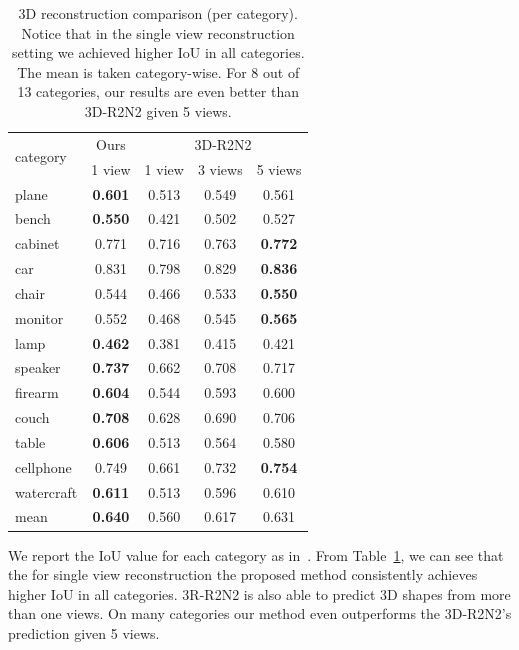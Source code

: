 \begin{table}[t!]
\centering
{
  \begin{tabular}{l|c|c|c|c}
  \hline
  \multirow{2}{*}{category} & Ours & \multicolumn{3}{|c}{3D-R2N2} \\  
  \cline{2-5}
   & 1 view & 1 view & 3 views & 5 views
  \\
  \hline
  \hline
  plane & {\textbf{0.601}} & 0.513 & 0.549 & 0.561 \\
%
  bench & {\textbf{0.550}} & 0.421 & 0.502 & 0.527 \\
  cabinet & {0.771} & 0.716 & 0.763 & \textbf{0.772}  \\
  car & {0.831} & 0.798 & 0.829 & \textbf{0.836} \\
  chair & {0.544} & 0.466 & 0.533 & \textbf{0.550}  \\
  monitor & {0.552} & 0.468 & 0.545 & \textbf{0.565} \\
  lamp & {\textbf{0.462}} & 0.381 & 0.415 & 0.421 \\
  speaker & {\textbf{0.737}} & 0.662 & 0.708 & 0.717 \\
  firearm & {\textbf{0.604}} & 0.544 & 0.593 & 0.600 \\
  couch & {\textbf{0.708}} & 0.628 & 0.690 & 0.706 \\
  table & {\textbf{0.606}} & 0.513 & 0.564 & 0.580 \\
  cellphone & {0.749} & 0.661 & 0.732 & \textbf{0.754} \\
  watercraft & {\textbf{0.611}} & 0.513 & 0.596 & 0.610 \\
  \hline
  mean & {\textbf{0.640}} & 0.560 & 0.617 & 0.631 \\
  \hline
  \end{tabular}
  }
  \caption{3D reconstruction comparison (per category). Notice that in the single view reconstruction setting we achieved higher IoU in all categories. The mean is taken category-wise. For 8 out of 13 categories, our results are even better than 3D-R2N2 given 5 views.}\label{tab:compare_category}
\end{table}

We report the IoU value for each category as in~\cite{choy20163d}. From Table~\ref{tab:compare_category},
we can see that the for single view reconstruction the proposed method consistently achieves higher IoU in all categories. 3R-R2N2 is also able to predict 3D shapes from more than one views. On many categories our method even outperforms the 3D-R2N2's prediction given 5 views.

